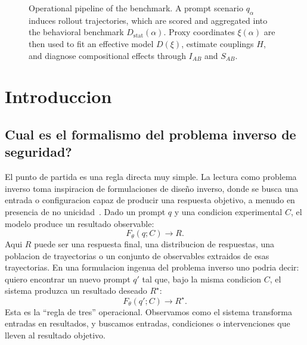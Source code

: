 \documentclass[10pt,twocolumn]{article}
\begin{document}
\begin{figure}
\caption{
Operational pipeline of the benchmark. A prompt scenario \(q_\alpha\)
induces rollout trajectories, which are scored and aggregated into the
behavioral benchmark \(D_{\mathrm{stat}}(\alpha)\). Proxy coordinates
\(\xi(\alpha)\) are then used to fit an effective model \(D(\xi)\), estimate
couplings \(H\), and diagnose compositional effects through \(I_{AB}\) and
\(S_{AB}\).
}
\label{fig:pipeline}
\end{figure}

\newpage

\section{Introduccion}

\subsection{Cual es el formalismo del problema inverso de seguridad?}

El punto de partida es una regla directa muy simple. La lectura como problema inverso toma inspiracion de formulaciones de diseño inverso, donde se busca una entrada o configuracion capaz de producir una respuesta objetivo, a menudo en presencia de no unicidad~\cite{liu2018training,molesky2018inverse}. Dado un prompt \(q\) y una condicion experimental \(C\), el modelo produce un resultado observable:
\[
F_{\theta}(q;C)\longrightarrow R.
\]
Aqui \(R\) puede ser una respuesta final, una distribucion de respuestas, una poblacion de trayectorias o un conjunto de observables extraidos de esas trayectorias. En una formulacion ingenua del problema inverso uno podria decir: quiero encontrar un nuevo prompt \(q'\) tal que, bajo la misma condicion \(C\), el sistema produzca un resultado deseado \(R^\star\):
\[
F_{\theta}(q';C)\longrightarrow R^\star.
\]
Esta es la ``regla de tres'' operacional. Observamos como el sistema transforma entradas en resultados, y buscamos entradas, condiciones o intervenciones que lleven al resultado objetivo.
\end{document}
